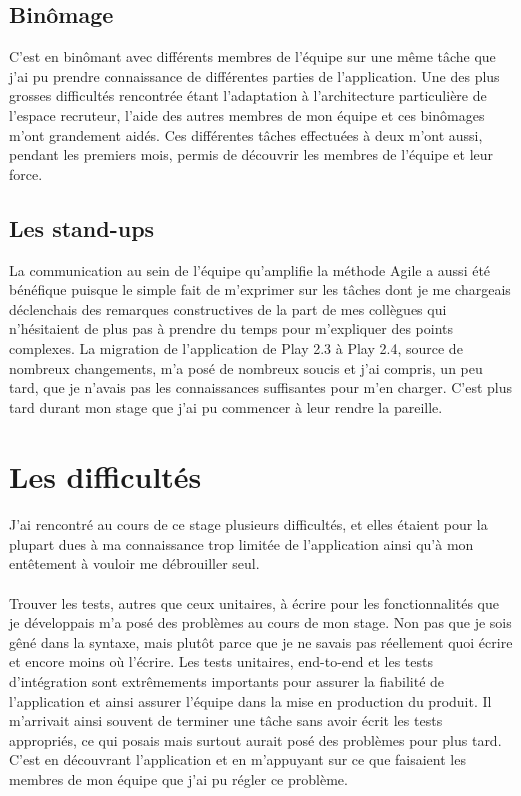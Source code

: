 \subsection{Binômage}
C'est en binômant avec différents membres de l'équipe sur une même tâche que j'ai pu prendre connaissance de différentes parties de l'application.
Une des plus grosses difficultés rencontrée étant l'adaptation à l'architecture particulière de l'espace recruteur, l'aide des autres membres de mon équipe et ces binômages m'ont grandement aidés.
Ces différentes tâches effectuées à deux m'ont aussi, pendant les premiers mois, permis de découvrir les membres de l'équipe et leur force.
\subsection{Les stand-ups}
La communication au sein de l'équipe qu'amplifie la méthode Agile a aussi été bénéfique puisque le simple fait de m'exprimer sur les tâches dont je me chargeais déclenchais des remarques constructives de la part de mes collègues qui n'hésitaient de plus pas à prendre du temps pour m'expliquer des points complexes.
La migration de l'application de Play 2.3 à Play 2.4, source de nombreux changements, m'a posé de nombreux soucis et j'ai compris, un peu tard, que je n'avais pas les connaissances suffisantes pour m'en charger.
C'est plus tard durant mon stage que j'ai pu commencer à leur rendre la pareille.

\section{Les difficultés}
\paragraph{}
J'ai rencontré au cours de ce stage plusieurs difficultés, et elles étaient pour la plupart dues à ma connaissance trop limitée de l'application ainsi qu'à mon entêtement à vouloir me débrouiller seul.
\paragraph{}
Trouver les tests, autres que ceux unitaires, à écrire pour les fonctionnalités que je développais m'a posé des problèmes au cours de mon stage.
Non pas que je sois gêné dans la syntaxe, mais plutôt parce que je ne savais pas réellement quoi écrire et encore moins où l'écrire.
Les tests unitaires, end-to-end et les tests d'intégration sont extrêmements importants pour assurer la fiabilité de l'application et ainsi assurer l'équipe dans la mise en production du produit.
Il m'arrivait ainsi souvent de terminer une tâche sans avoir écrit les tests appropriés, ce qui posais mais surtout aurait posé des problèmes pour plus tard.
C'est en découvrant l'application et en m'appuyant sur ce que faisaient les membres de mon équipe que j'ai pu régler ce problème.
